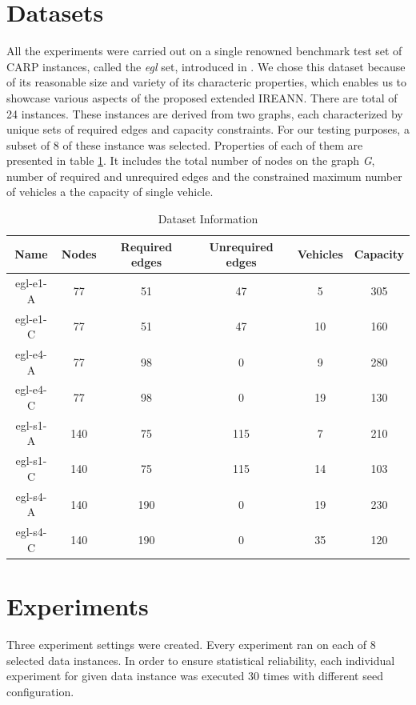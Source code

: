 \documentclass[twoside]{ctuthesis}
\theoremstyle{plain}
\theoremstyle{definition}
\theoremstyle{note}
\begin{document}
\section{Datasets}
All the experiments were carried out on a single renowned benchmark test set of CARP instances, called the \emph{egl} set, introduced in \cite{EGLESE1994231}. We chose this dataset because of its reasonable size and variety of its characteric properties, which enables us to showcase various aspects of the proposed extended IREANN. There are total of 24 instances. These instances are derived from two graphs, each characterized by unique sets of required edges and capacity constraints. For our testing purposes, a subset of 8 of these instance was selected. Properties of each of them are presented in table \ref{tab:dataset}. It includes the total number of nodes on the graph \emph{G}, number of required and unrequired edges and the constrained maximum number of vehicles a the capacity of single vehicle.

\begin{table}[htbp]
	\centering
	\caption{Dataset Information}
	\label{tab:dataset}
	\begin{tabular}{cccccc}
		\textbf{Name} & \textbf{Nodes} & \textbf{Required edges} & \textbf{Unrequired edges} & \textbf{Vehicles} & \textbf{Capacity} \\
		\hline
		egl-e1-A & 77 & 51 & 47 & 5 & 305 \\
		egl-e1-C & 77 & 51 & 47 & 10 & 160 \\
		egl-e4-A & 77 & 98 & 0 & 9 & 280 \\
		egl-e4-C & 77 & 98 & 0 & 19 & 130 \\
		egl-s1-A & 140 & 75 & 115 & 7 & 210 \\
		egl-s1-C & 140 & 75 & 115 & 14 & 103 \\
		egl-s4-A & 140 & 190 & 0 & 19 & 230 \\
		egl-s4-C & 140 & 190 & 0 & 35 & 120 \\
		\hline
	\end{tabular}
\end{table}


\section{Experiments}
\label{sec:expdesc}
Three experiment settings were created. Every experiment ran on each of 8 selected data instances.
In order to ensure statistical reliability, each individual experiment for given data instance was executed 30 times with different seed configuration.
\end{document}

